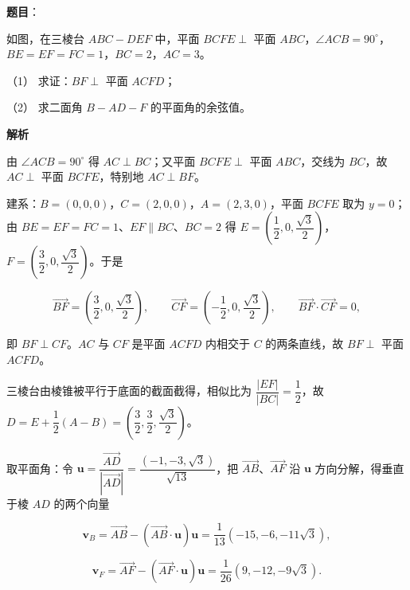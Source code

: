 \begin{answer}

\textbf{题目}：

如图，在三棱台 \(ABC-DEF\) 中，平面 \(BCFE\perp\) 平面 \(ABC\)，\(\angle ACB=90^{\circ}\)，\(BE=EF=FC=1\)，\(BC=2\)，\(AC=3\)。

（1） 求证：\(BF\perp\) 平面 \(ACFD\)；

（2） 求二面角 \(B-AD-F\) 的平面角的余弦值。
\nopagebreak[4]
\begin{center}\end{center}
\nopagebreak[4]
\textbf{解析}


由 \(\angle ACB=90^{\circ}\) 得 \(AC\perp BC\)；又平面 \(BCFE\perp\) 平面 \(ABC\)，交线为 \(BC\)，故 \(AC\perp\) 平面 \(BCFE\)，特别地 \(AC\perp BF\)。

建系：\(B=(0,0,0)\)，\(C=(2,0,0)\)，\(A=(2,3,0)\)，平面 \(BCFE\) 取为 \(y=0\)；由 \(BE=EF=FC=1\)、\(EF\parallel BC\)、\(BC=2\) 得 \(E=\left(\dfrac{1}{2},0,\dfrac{\sqrt{3}}{2}\right)\)，\(F=\left(\dfrac{3}{2},0,\dfrac{\sqrt{3}}{2}\right)\)。于是

\nopagebreak[4]
\[
\overrightarrow{BF}=\left(\dfrac{3}{2},0,\dfrac{\sqrt{3}}{2}\right),\qquad\overrightarrow{CF}=\left(-\dfrac{1}{2},0,\dfrac{\sqrt{3}}{2}\right),\qquad\overrightarrow{BF}\cdot\overrightarrow{CF}=0,
\]

即 \(BF\perp CF\)。\(AC\) 与 \(CF\) 是平面 \(ACFD\) 内相交于 \(C\) 的两条直线，故 \(BF\perp\) 平面 \(ACFD\)。


三棱台由棱锥被平行于底面的截面截得，相似比为 \(\dfrac{|EF|}{|BC|}=\dfrac{1}{2}\)，故 \(D=E+\dfrac{1}{2}(A-B)=\left(\dfrac{3}{2},\dfrac{3}{2},\dfrac{\sqrt{3}}{2}\right)\)。

取平面角：令 \(\boldsymbol{u}=\dfrac{\overrightarrow{AD}}{|\overrightarrow{AD}|}=\dfrac{(-1,-3,\sqrt{3})}{\sqrt{13}}\)，把 \(\overrightarrow{AB}\)、\(\overrightarrow{AF}\) 沿 \(\boldsymbol{u}\) 方向分解，得垂直于棱 \(AD\) 的两个向量

\nopagebreak[4]
\[
\boldsymbol{v}_{B}=\overrightarrow{AB}-(\overrightarrow{AB}\cdot\boldsymbol{u})\boldsymbol{u}=\dfrac{1}{13}\left(-15,-6,-11\sqrt{3}\right),
\]

\nopagebreak[4]
\[
\boldsymbol{v}_{F}=\overrightarrow{AF}-(\overrightarrow{AF}\cdot\boldsymbol{u})\boldsymbol{u}=\dfrac{1}{26}\left(9,-12,-9\sqrt{3}\right).
\]


\end{answer}
